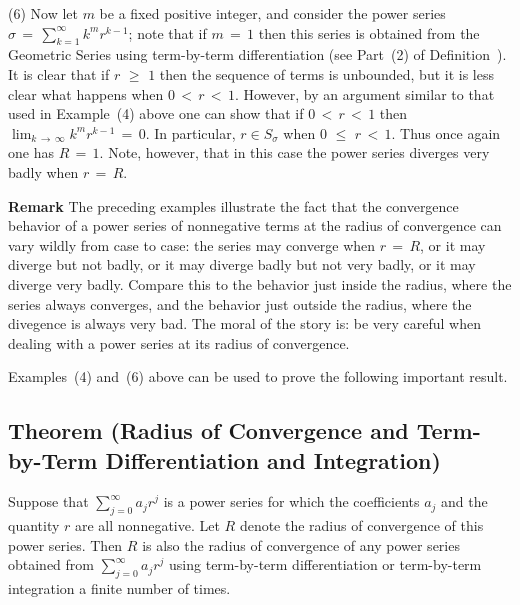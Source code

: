 \V

        (6) Now let $m$ be a fixed positive integer, and consider the power series ${\sigma} \,=\, \sum_{k=1}^{{\infty}} k^{m}r^{k-1}$;
    note that if $m \,=\, 1$ then this series is obtained from the Geometric Series using term-by-term differentiation
    (see Part~(2) of Definition~).
    It is clear that if $r\,\,{\geq}\,\,1$ then the sequence of terms is unbounded,
    but it is less clear what happens when $0\,<\,r\,<\,1$. However, by an argument similar to that used in Example~(4) above one can show that if $0\,<\,r\,<\,1$ then $\lim_{k \,{\rightarrow}\, {\infty}} k^{m}r^{k-1} \,=\, 0$.
    In particular, $r{\in}S_{{\sigma}}$ when $0\,\,{\leq}\,\,r\,<\,1$.
    Thus once again one has $R \,=\, 1$.
    Note, however, that in this case the power series diverges very badly when $r \,=\, R$.

\V

        {\bf Remark} The preceding examples illustrate the fact that the convergence behavior of a power series of nonnegative terms at the radius of convergence can vary wildly from case to case:
    the series may converge when $r \,=\, R$, or it may diverge but not badly, or it may diverge badly but not very badly, or it may diverge very badly.
    Compare this to the behavior just inside the radius, where the series always converges,
    and the behavior just outside the radius, where the divegence is always very bad.
    The moral of the story is: be very careful when dealing with a power series at its radius of convergence.

\V
\V

        Examples~(4) and~(6) above can be used to prove the following important result.

\V

        \subsection{\small{{\bf Theorem}} (Radius of Convergence and Term-by-Term Differentiation and Integration)}
        \label{ThmG50.60}

\V

        Suppose that $\sum_{j=0}^{{\infty}} a_{j}r^{j}$ is a power series for which the coefficients $a_{j}$ and the quantity $r$ are all nonnegative.
    Let $R$ denote the radius of convergence of this power series. Then $R$ is also the radius of convergence of any power series obtained from 
    $\sum_{j=0}^{{\infty}} a_{j}r^{j}$ using term-by-term differentiation or term-by-term integration a finite number of times.

